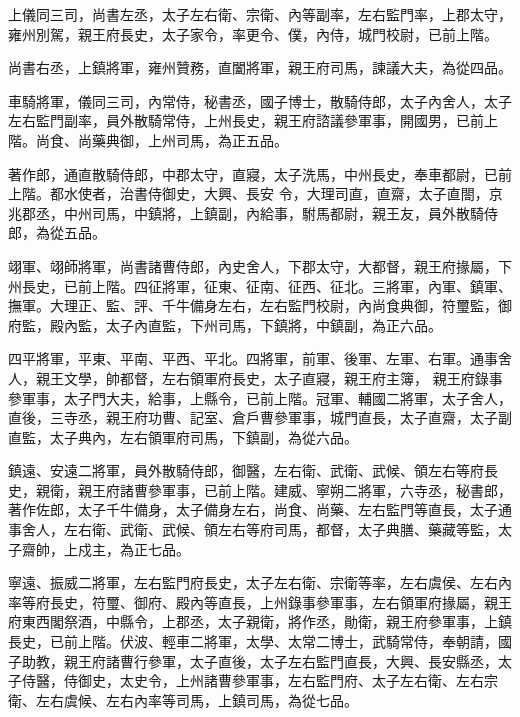 \begin{pinyinscope}
 上儀同三司，尚書左丞，太子左右衛、宗衛、內等副率，左右監門率，上郡太守，雍州別駕，親王府長史，太子家令，率更令、僕，內侍，城門校尉，已前上階。



 尚書右丞，上鎮將軍，雍州贊務，直闔將軍，親王府司馬，諫議大夫，為從四品。



 車騎將軍，儀同三司，內常侍，秘書丞，國子博士，散騎侍郎，太子內舍人，太子左右監門副率，員外散騎常侍，上州長史，親王府諮議參軍事，開國男，已前上階。尚食、尚藥典御，上州司馬，為正五品。



 著作郎，通直散騎侍郎，中郡太守，直寢，太子洗馬，中州長史，奉車都尉，已前上階。都水使者，治書侍御史，大興、長安
 令，大理司直，直齋，太子直閤，京兆郡丞，中州司馬，中鎮將，上鎮副，內給事，駙馬都尉，親王友，員外散騎侍郎，為從五品。



 翊軍、翊師將軍，尚書諸曹侍郎，內史舍人，下郡太守，大都督，親王府掾屬，下州長史，已前上階。四征將軍，征東、征南、征西、征北。三將軍，內軍、鎮軍、撫軍。大理正、監、評、千牛備身左右，左右監門校尉，內尚食典御，符璽監，御府監，殿內監，太子內直監，下州司馬，下鎮將，中鎮副，為正六品。



 四平將軍，平東、平南、平西、平北。四將軍，前軍、後軍、左軍、右軍。通事舍人，親王文學，帥都督，左右領軍府長史，太子直寢，親王府主簿，
 親王府錄事參軍事，太子門大夫，給事，上縣令，已前上階。冠軍、輔國二將軍，太子舍人，直後，三寺丞，親王府功曹、記室、倉戶曹參軍事，城門直長，太子直齋，太子副直監，太子典內，左右領軍府司馬，下鎮副，為從六品。



 鎮遠、安遠二將軍，員外散騎侍郎，御醫，左右衛、武衛、武候、領左右等府長史，親衛，親王府諸曹參軍事，已前上階。建威、寧朔二將軍，六寺丞，秘書郎，著作佐郎，太子千牛備身，太子備身左右，尚食、尚藥、左右監門等直長，太子通事舍人，左右衛、武衛、武候、領左右等府司馬，都督，太子典膳、藥藏等監，太子齋帥，上戍主，為正七品。



 寧遠、振威二將軍，左右監門府長史，太子左右衛、宗衛等率，左右虞侯、左右內率等府長史，符璽、御府、殿內等直長，上州錄事參軍事，左右領軍府掾屬，親王府東西閣祭酒，中縣令，上郡丞，太子親衛，將作丞，勛衛，親王府參軍事，上鎮長史，已前上階。伏波、輕車二將軍，太學、太常二博士，武騎常侍，奉朝請，國子助教，親王府諸曹行參軍，太子直後，太子左右監門直長，大興、長安縣丞，太子侍醫，侍御史，太史令，上州諸曹參軍事，左右監門府、太子左右衛、左右宗衛、左右虞候、左右內率等司馬，上鎮司馬，為從七品。




\end{pinyinscope}
